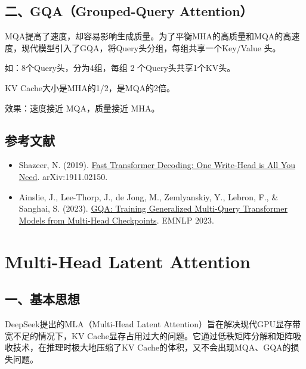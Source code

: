 \hypertarget{ux4e8cgqagrouped-query-attention}{%
\subsection{二、GQA（Grouped-Query Attention）}\label{ux4e8cgqagrouped-query-attention}}

MQA提高了速度，却容易影响生成质量。为了平衡MHA的高质量和MQA的高速度，现代模型引入了GQA，将Query头分组，每组共享一个Key/Value 头。

如：8个Query头，分为4组，每组 2 个Query头共享1个KV头。

KV Cache大小是MHA的1/2，是MQA的2倍。

效果：速度接近 MQA，质量接近 MHA。

\hypertarget{ux53c2ux8003ux6587ux732e-93}{%
\subsection{参考文献}\label{ux53c2ux8003ux6587ux732e-93}}

\begin{itemize}
\tightlist
\item
  Shazeer, N. (2019). \href{https://arxiv.org/abs/1911.02150}{Fast Transformer Decoding: One Write-Head is All You Need}. arXiv:1911.02150.
\item
  Ainslie, J., Lee-Thorp, J., de Jong, M., Zemlyanskiy, Y., Lebron, F., \& Sanghai, S. (2023). \href{https://arxiv.org/abs/2305.13245}{GQA: Training Generalized Multi-Query Transformer Models from Multi-Head Checkpoints}. EMNLP 2023.
\end{itemize}

\clearpage

\hypertarget{multi-head-latent-attention}{%
\section{Multi-Head Latent Attention}\label{multi-head-latent-attention}}

\hypertarget{ux4e00ux57faux672cux601dux60f3-1}{%
\subsection{一、基本思想}\label{ux4e00ux57faux672cux601dux60f3-1}}

DeepSeek提出的MLA（Multi-Head Latent Attention）旨在解决现代GPU显存带宽不足的情况下，KV Cache显存占用过大的问题。它通过低秩矩阵分解和矩阵吸收技术，在推理时极大地压缩了KV Cache的体积，又不会出现MQA、GQA的损失问题。

